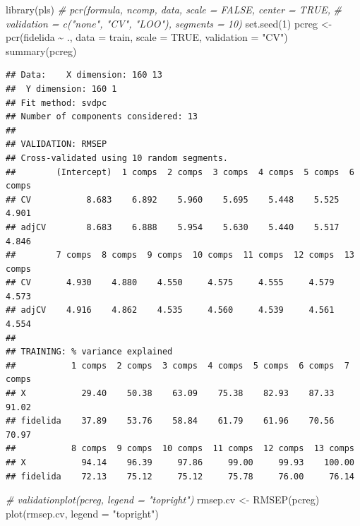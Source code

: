 \documentclass[
  spanish,
]{book}
\newenvironment{Shaded}{\begin{snugshade}}{\end{snugshade}}
\newcommand{\AttributeTok}[1]{\textcolor[rgb]{0.77,0.63,0.00}{#1}}
\newcommand{\CommentTok}[1]{\textcolor[rgb]{0.56,0.35,0.01}{\textit{#1}}}
\newcommand{\ConstantTok}[1]{\textcolor[rgb]{0.00,0.00,0.00}{#1}}
\newcommand{\DecValTok}[1]{\textcolor[rgb]{0.00,0.00,0.81}{#1}}
\newcommand{\FunctionTok}[1]{\textcolor[rgb]{0.00,0.00,0.00}{#1}}
\newcommand{\NormalTok}[1]{#1}
\newcommand{\OtherTok}[1]{\textcolor[rgb]{0.56,0.35,0.01}{#1}}
\newcommand{\SpecialCharTok}[1]{\textcolor[rgb]{0.00,0.00,0.00}{#1}}
\newcommand{\StringTok}[1]{\textcolor[rgb]{0.31,0.60,0.02}{#1}}
\theoremstyle{break}
\theoremstyle{definition}
\theoremstyle{definition}
\theoremstyle{definition}
\theoremstyle{definition}
\theoremstyle{remark}
\begin{document}
\begin{Shaded}
\begin{Highlighting}[]
\FunctionTok{library}\NormalTok{(pls)}
\CommentTok{\# pcr(formula, ncomp, data, scale = FALSE, center = TRUE, }
\CommentTok{\#     validation = c("none", "CV", "LOO"), segments = 10)}
\FunctionTok{set.seed}\NormalTok{(}\DecValTok{1}\NormalTok{)}
\NormalTok{pcreg }\OtherTok{\textless{}{-}} \FunctionTok{pcr}\NormalTok{(fidelida }\SpecialCharTok{\textasciitilde{}}\NormalTok{ ., }\AttributeTok{data =}\NormalTok{ train, }\AttributeTok{scale =} \ConstantTok{TRUE}\NormalTok{, }\AttributeTok{validation =} \StringTok{"CV"}\NormalTok{)}
\FunctionTok{summary}\NormalTok{(pcreg)}
\end{Highlighting}
\end{Shaded}

\begin{verbatim}
## Data:    X dimension: 160 13 
##  Y dimension: 160 1
## Fit method: svdpc
## Number of components considered: 13
## 
## VALIDATION: RMSEP
## Cross-validated using 10 random segments.
##        (Intercept)  1 comps  2 comps  3 comps  4 comps  5 comps  6 comps
## CV           8.683    6.892    5.960    5.695    5.448    5.525    4.901
## adjCV        8.683    6.888    5.954    5.630    5.440    5.517    4.846
##        7 comps  8 comps  9 comps  10 comps  11 comps  12 comps  13 comps
## CV       4.930    4.880    4.550     4.575     4.555     4.579     4.573
## adjCV    4.916    4.862    4.535     4.560     4.539     4.561     4.554
## 
## TRAINING: % variance explained
##           1 comps  2 comps  3 comps  4 comps  5 comps  6 comps  7 comps
## X           29.40    50.38    63.09    75.38    82.93    87.33    91.02
## fidelida    37.89    53.76    58.84    61.79    61.96    70.56    70.97
##           8 comps  9 comps  10 comps  11 comps  12 comps  13 comps
## X           94.14    96.39     97.86     99.00     99.93    100.00
## fidelida    72.13    75.12     75.12     75.78     76.00     76.14
\end{verbatim}

\begin{Shaded}
\begin{Highlighting}[]
\CommentTok{\# validationplot(pcreg, legend = "topright") }
\NormalTok{rmsep.cv }\OtherTok{\textless{}{-}} \FunctionTok{RMSEP}\NormalTok{(pcreg)}
\FunctionTok{plot}\NormalTok{(rmsep.cv, }\AttributeTok{legend =} \StringTok{"topright"}\NormalTok{)}
\end{Highlighting}
\end{Shaded}
\end{document}
